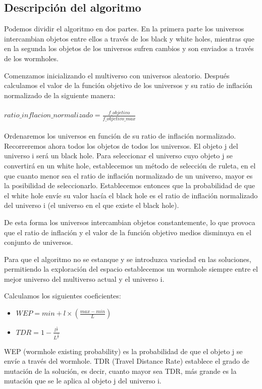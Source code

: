 \subsection{Descripción del algoritmo}
Podemos dividir el algoritmo en dos partes. En la primera parte los universos intercambian objetos entre ellos a través de los black y white holes, mientras que en la segunda los objetos de los universos sufren cambios y son enviados a través de los wormholes.

Comenzamos inicializando el multiverso con universos aleatorio. Después calculamos el valor de la función objetivo de los universos y su ratio de inflación normalizado de la siguiente manera:\\\\ $ ratio\_inflacion\_normalizado = \frac{f\_objetivo}{f\_objetivo\_max} $ \\\\

Ordenaremos los universos en función de su ratio de inflación normalizado.
Recorreremos ahora todos los objetos de todos los universos. El objeto j del universo i será un black hole. Para seleccionar el universo cuyo objeto j se convertirá en un white hole, establecemos un método de selección de ruleta, en el que cuanto menor sea el ratio de inflación normalizado de un universo, mayor es la posibilidad de seleccionarlo. Establecemos entonces que la probabilidad de que el white hole envíe su valor hacía el black hole es el ratio de inflación normalizado del universo i (el universo en el que existe el black hole).

De esta forma los universos intercambian objetos constantemente, lo que provoca que el ratio de inflación y el valor de la función objetivo medios disminuya en el conjunto de universos.

Para que el algoritmo no se estanque y se introduzca variedad en las soluciones, permitiendo la exploración del espacio establecemos un wormhole siempre entre el mejor universo del multiverso actual y el universo i.

Calculamos los siguientes coeficientes:
\begin{itemize}
   \item $WEP = min + l \times (\frac{max - min}{L})$
   \item $TDR = 1 - \frac{l^{\frac{1}{p}}}{L^{\frac{1}{p}}}$
\end{itemize}
WEP (wormhole existing probability) es la probabilidad de que el objeto j se envíe a través del wormhole.
TDR (Travel Distance Rate) establece el grado de mutación de la solución, es decir, cuanto mayor sea TDR, más grande es la mutación que se le aplica al objeto j del universo i.


